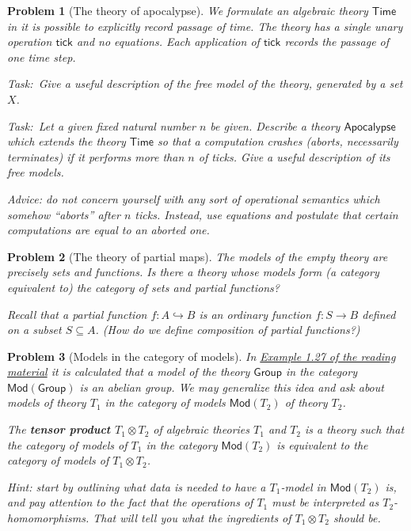 \documentclass{article}
\newcommand{\task}{\par\noindent\emph{Task:}\ }
\newtheorem{problem}{Problem}[section]}
\begin{document}
\begin{problem}[The theory of apocalypse]
We formulate an algebraic theory $\mathsf{Time}$ in it is possible to
explicitly record passage of time. The theory has a single unary
operation $\mathsf{tick}$ and no equations. Each application of
$\mathsf{tick}$ records the passage of one time step.

\task Give a useful description of the free model of the
theory, generated by a set $X$.

\task Let a given fixed natural number $n$ be given.
Describe a theory $\mathsf{Apocalypse}$ which extends the theory
$\mathsf{Time}$ so that a computation crashes (aborts, necessarily
terminates) if it performs more than $n$ of ticks. Give a useful
description of its free models.

Advice: do \emph{not} concern yourself with any sort of operational
semantics which somehow ``aborts'' after $n$ ticks. Instead, use
equations and postulate that certain computations are equal to an
aborted one.
\end{problem}

\begin{problem}[The theory of partial maps]

The models of the empty theory are precisely sets and functions. Is
there a theory whose models form (a category equivalent to) the category
of sets and \emph{partial} functions?

Recall that a partial function $f : A \hookrightarrow B$ is an ordinary
function $f : S \to B$ defined on a subset $S \subseteq A$.
(How do we define composition of partial functions?)
\end{problem}

\begin{problem}[Models in the category of models]

In \href{https://arxiv.org/abs/1807.05923}{Example 1.27 of the reading
material} it is calculated that a model of the theory $\mathsf{Group}$ in
the category $\mathsf{Mod}(\textsf{Group})$ is an abelian group. We may generalize
this idea and ask about models of theory $T_1$ in the category of
models $\mathsf{Mod}(T_2)$ of theory $T_2$.

The \textbf{tensor product $T_1 \otimes T_2$} of algebraic theories
$T_1$ and $T_2$ is a theory such that the category of models
of $T_1$ in the category $\mathsf{Mod}(T_2)$ is equivalent to the
category of models of $T_1 \otimes T_2$.

Hint: start by outlining what data is needed to have a $T_1$-model
in $\mathsf{Mod}(T_2)$ is, and pay attention to the fact that the
operations of $T_1$ must be interpreted as
$T_2$-homomorphisms. That will tell you what the ingredients of
$T_1 \otimes T_2$ should be.
\end{problem}
\end{document}
